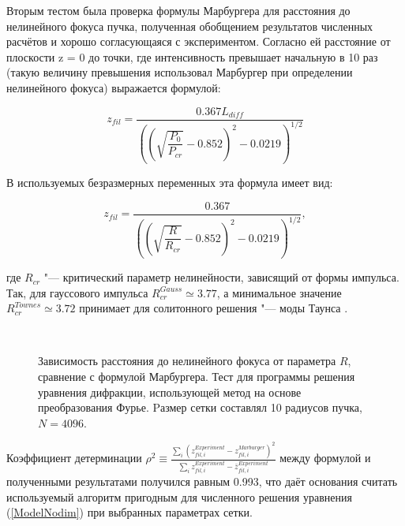Вторым тестом была проверка формулы Марбургера \cite{DawestMarburger1969} для расстояния до нелинейного фокуса пучка,
полученная обобщением результатов численных расчётов и хорошо согласующаяся с экспериментом.
Согласно ей расстояние от плоскости z = 0 до точки, где интенсивность превышает начальную
в 10 раз (такую величину превышения использовал Марбургер при определении нелинейного фокуса) выражается формулой:

\begin{equation}\label{ModelMarburgerDim}
z_{fil} = \dfrac{0.367 L_{diff}}{\left( \left( \sqrt{\dfrac{P_0}{P_{cr}}} - 0.852 \right)^2 - 0.0219 \right)^{1/2}}
\end{equation}

В используемых безразмерных переменных эта формула имеет вид:

\begin{equation}\label{ModelMarburgerModim}
z_{fil} = \dfrac{0.367}{\left( \left( \sqrt{\dfrac{R}{R_{cr}}} - 0.852 \right)^2 - 0.0219 \right)^{1/2}},
\end{equation}

\noindent где $R_{cr}$ "--- критический параметр нелинейности, зависящий от формы импульса.
Так, для гауссового импульса $R_{cr}^{Gauss} \simeq 3.77$, а минимальное значение $R_{cr}^{Townes} \simeq 3.72$
принимает для солитонного решения "--- моды Таунса \cite{ChiaoGarmireTownes1964}.


\begin{figure}[H]
    \begin{center}
        \begin{minipage}{\minipagewidthtwo}
        \end{minipage}
        \\[1ex]
        \caption{Зависимость расстояния до нелинейного фокуса от параметра $R$, сравнение с формулой Марбургера.
                 Тест для программы решения уравнения дифракции, использующей метод на основе преобразования Фурье.
                 Pазмер сетки составлял 10 радиусов пучка, $N = 4096$.}
        \label{fig:ModelTestMarburger}
    \end{center}
\end{figure}


Коэффициент детерминации $\rho^2 \equiv \frac{\sum_i (z_{fil,i}^{Experiment} - z_{fil,i}^{Marburger})^2}{\sum_i z_{fil,i}^{Experiment} - \bar{z}_{fil,i}^{Experiment}}$ между формулой и полученными результатами получился равным 0.993,
что даёт основания считать используемый алгоритм пригодным для численного решения уравнения (\ref{ModelNodim}) при выбранных параметрах сетки.

